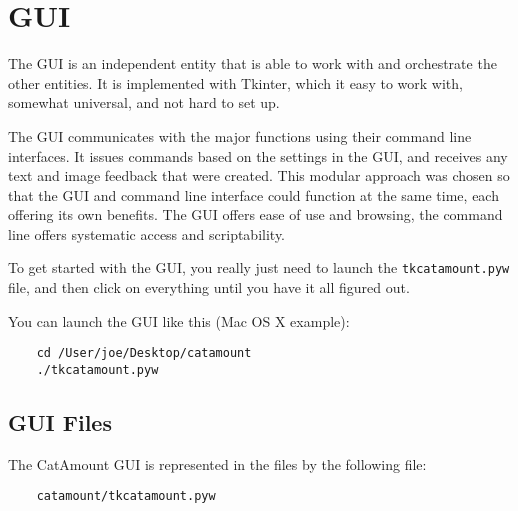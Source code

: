 \chapter{GUI}
\hypertarget{gui}{}

The GUI is an independent entity that is able to work with and
orchestrate the other entities. It is implemented with Tkinter, which
it easy to work with, somewhat universal, and not hard to set up.

The GUI communicates with the major functions using their command line
interfaces. It issues commands based on the settings in the GUI, and
receives any text and image feedback that were created. This modular
approach was chosen so that the GUI and command line interface could
function at the same time, each offering its own benefits. The GUI
offers ease of use and browsing, the command line offers systematic
access and scriptability.

To get started with the GUI, you really just need to launch the
\texttt{tkcatamount.pyw} file, and then click on everything until you
have it all figured out.

You can launch the GUI like this (Mac OS X example):

\begin{verbatim}
    cd /User/joe/Desktop/catamount
    ./tkcatamount.pyw
\end{verbatim}

\section{GUI Files}

The CatAmount GUI is represented in the files by the following file:

\begin{verbatim}
    catamount/tkcatamount.pyw
\end{verbatim}


